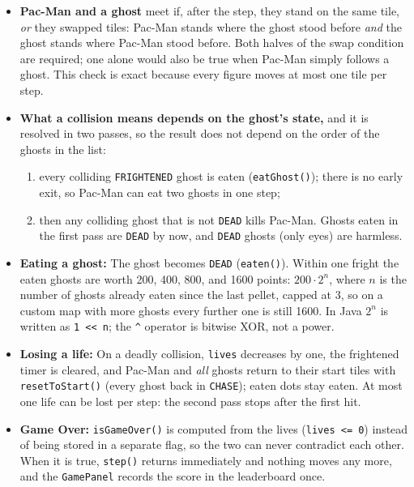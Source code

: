 \documentclass[11pt, a4paper]{article}
\begin{document}
\begin{itemize}
    The duration never reaches 0: a 0-step fright would turn the ghosts white and around, and the countdown could leave them frightened forever. A new pellet restarts the full duration.
    \item \textbf{Pac-Man and a ghost} meet if, after the step, they stand on the same tile, \textit{or} they swapped tiles: Pac-Man stands where the ghost stood before \textit{and} the ghost stands where Pac-Man stood before. Both halves of the swap condition are required; one alone would also be true when Pac-Man simply follows a ghost. This check is exact because every figure moves at most one tile per step.
    \item \textbf{What a collision means depends on the ghost's state,} and it is resolved in two passes, so the result does not depend on the order of the ghosts in the list:
    \begin{enumerate}
        \item every colliding \texttt{FRIGHTENED} ghost is eaten (\texttt{eatGhost()}); there is no early exit, so Pac-Man can eat two ghosts in one step;
        \item then any colliding ghost that is not \texttt{DEAD} kills Pac-Man. Ghosts eaten in the first pass are \texttt{DEAD} by now, and \texttt{DEAD} ghosts (only eyes) are harmless.
    \end{enumerate}
    \item \textbf{Eating a ghost:} The ghost becomes \texttt{DEAD} (\texttt{eaten()}). Within one fright the eaten ghosts are worth 200, 400, 800, and 1600 points: $200 \cdot 2^n$, where $n$ is the number of ghosts already eaten since the last pellet, capped at 3, so on a custom map with more ghosts every further one is still 1600. In Java $2^n$ is written as \texttt{1 << n}; the \texttt{\^{}} operator is bitwise XOR, not a power.
    \item \textbf{Losing a life:} On a deadly collision, \texttt{lives} decreases by one, the frightened timer is cleared, and Pac-Man and \textit{all} ghosts return to their start tiles with \texttt{resetToStart()} (every ghost back in \texttt{CHASE}); eaten dots stay eaten. At most one life can be lost per step: the second pass stops after the first hit.
    \item \textbf{Game Over:} \texttt{isGameOver()} is computed from the lives (\texttt{lives <= 0}) instead of being stored in a separate flag, so the two can never contradict each other. When it is true, \texttt{step()} returns immediately and nothing moves any more, and the \texttt{GamePanel} records the score in the leaderboard once.
\end{itemize}
\end{document}
